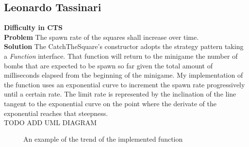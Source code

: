 \documentclass[a4paper,12pt]{report}
\begin{document}
\subsection*{Leonardo Tassinari}
\textbf{Difficulty in CTS}\\
\textbf{Problem} The spawn rate of the squares shall increase over time.\\
\textbf{Solution} The CatchTheSquare's constructor adopts the strategy pattern taking a \textit{Function} interface. That function will return to the minigame the number of bombs that are expected to be spawn so far given the total amount of milliseconds elapsed from the beginning of the minigame.
My implementation of the function uses an exponential curve to increment the spawn rate progressively until a certain rate.
The limit rate is represented by the inclination of the line tangent to the exponential curve on the point where the derivate of the exponential reaches that steepness.\\
TODO ADD UML DIAGRAM
\begin{figure}[ht]    
	\centering
{}
\caption{An example of the trend of the implemented function}
\end{figure}
\end{document}
